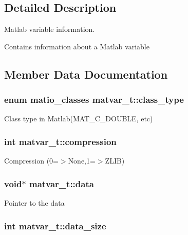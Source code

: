 \subsection{Detailed Description}
Matlab variable information. 

Contains information about a Matlab variable 

\subsection{Member Data Documentation}
\hypertarget{structmatvar__t_aff13035bf3265dd7d9425e5d40c839d4}{
\subsubsection[{class\-\_\-type}]{\setlength{\rightskip}{0pt plus 5cm}enum {\bf matio\-\_\-classes} matvar\-\_\-t\-::class\-\_\-type}}\label{structmatvar__t_aff13035bf3265dd7d9425e5d40c839d4}
Class type in Matlab(\-M\-A\-T\-\_\-\-C\-\_\-\-D\-O\-U\-B\-L\-E, etc) \hypertarget{structmatvar__t_a327abc8f4be853b9f26bc054ce1029e5}{
\subsubsection[{compression}]{\setlength{\rightskip}{0pt plus 5cm}int matvar\-\_\-t\-::compression}}\label{structmatvar__t_a327abc8f4be853b9f26bc054ce1029e5}
Compression (0=$>$None,1=$>$Z\-L\-I\-B) \hypertarget{structmatvar__t_a70d5c21dc70558757770d4d72ff5d3f4}{
\subsubsection[{data}]{\setlength{\rightskip}{0pt plus 5cm}void$\ast$ matvar\-\_\-t\-::data}}\label{structmatvar__t_a70d5c21dc70558757770d4d72ff5d3f4}
Pointer to the data \hypertarget{structmatvar__t_a9ad1c82e2b568da617e12dc73a26e1f9}{
\subsubsection[{data\-\_\-size}]{\setlength{\rightskip}{0pt plus 5cm}int matvar\-\_\-t\-::data\-\_\-size}}\label{structmatvar__t_a9ad1c82e2b568da617e12dc73a26e1f9}
